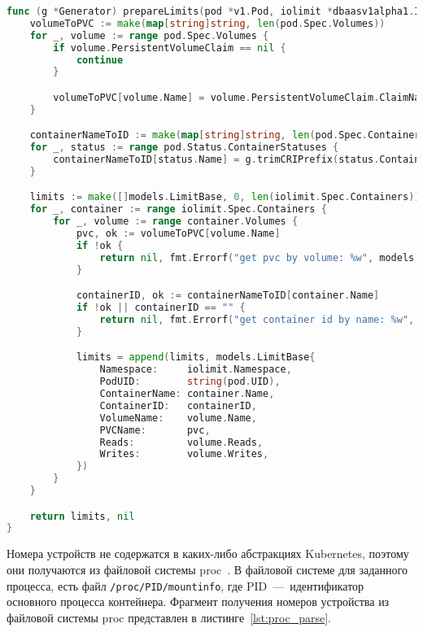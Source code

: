 \begin{lstlisting}[language=Go,label=lst:container_id, caption={Получение идентификатора контейнера}]
func (g *Generator) prepareLimits(pod *v1.Pod, iolimit *dbaasv1alpha1.IOLimit) ([]models.LimitBase, error) {
	volumeToPVC := make(map[string]string, len(pod.Spec.Volumes))
	for _, volume := range pod.Spec.Volumes {
		if volume.PersistentVolumeClaim == nil {
			continue
		}

		volumeToPVC[volume.Name] = volume.PersistentVolumeClaim.ClaimName
	}

	containerNameToID := make(map[string]string, len(pod.Spec.Containers))
	for _, status := range pod.Status.ContainerStatuses {
		containerNameToID[status.Name] = g.trimCRIPrefix(status.ContainerID)
	}

	limits := make([]models.LimitBase, 0, len(iolimit.Spec.Containers))
	for _, container := range iolimit.Spec.Containers {
		for _, volume := range container.Volumes {
			pvc, ok := volumeToPVC[volume.Name]
			if !ok {
				return nil, fmt.Errorf("get pvc by volume: %w", models.ErrPVCNotFound)
			}

			containerID, ok := containerNameToID[container.Name]
			if !ok || containerID == "" {
				return nil, fmt.Errorf("get container id by name: %w", models.ErrContainerNotFound)
			}

			limits = append(limits, models.LimitBase{
				Namespace:     iolimit.Namespace,
				PodUID:        string(pod.UID),
				ContainerName: container.Name,
				ContainerID:   containerID,
				VolumeName:    volume.Name,
				PVCName:       pvc,
				Reads:         volume.Reads,
				Writes:        volume.Writes,
			})
		}
	}

	return limits, nil
}
\end{lstlisting}

Номера устройств не содержатся в каких-либо абстракциях Kubernetes, поэтому они получаются из файловой системы proc~\cite{proc}. В файловой системе для заданного процесса, есть файл \texttt{/proc/PID/mountinfo}, где PID~---~идентификатор основного процесса контейнера. Фрагмент получения номеров устройства из файловой системы proc представлен в листинге~\ref{lst:proc_parse}.

